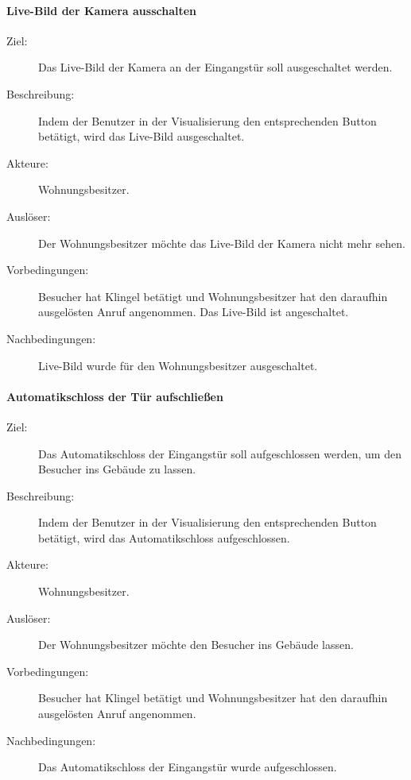 \paragraph{\large{Live-Bild der Kamera ausschalten}}
    \begin{description}
        \item[Ziel:] Das Live-Bild der Kamera an der Eingangstür soll ausgeschaltet werden.
        \item[Beschreibung:] Indem der Benutzer in der Visualisierung den entsprechenden Button betätigt, wird das Live-Bild ausgeschaltet.
        \item[Akteure:] Wohnungsbesitzer.
        \item[Auslöser:] Der Wohnungsbesitzer möchte das Live-Bild der Kamera nicht mehr sehen.
        \item[Vorbedingungen:] Besucher hat Klingel betätigt und Wohnungsbesitzer hat den daraufhin ausgelösten Anruf angenommen.
            Das Live-Bild ist angeschaltet.
        \item[Nachbedingungen:] Live-Bild wurde für den Wohnungsbesitzer ausgeschaltet.
    \end{description}

\paragraph{\large{Automatikschloss der Tür aufschließen}}
    \begin{description}
        \item[Ziel:] Das Automatikschloss der Eingangstür soll aufgeschlossen werden, um den Besucher ins Gebäude zu lassen.
        \item[Beschreibung:] Indem der Benutzer in der Visualisierung den entsprechenden Button betätigt, wird das Automatikschloss aufgeschlossen.
        \item[Akteure:] Wohnungsbesitzer.
        \item[Auslöser:] Der Wohnungsbesitzer möchte den Besucher ins Gebäude lassen.
        \item[Vorbedingungen:] Besucher hat Klingel betätigt und Wohnungsbesitzer hat den daraufhin ausgelösten Anruf angenommen.
        \item[Nachbedingungen:] Das Automatikschloss der Eingangstür wurde aufgeschlossen.
    \end{description}


